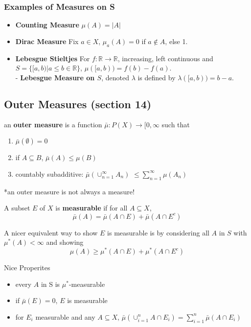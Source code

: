 \documentclass[a4paper, 12pt]{article}
\def\R{\ensuremath{\mathbb{R}}} %
\newcommand{\bt}[1]{\textbf{#1}} %
\begin{document}
\begin{multicols}{2}
\subsubsection{Examples of Measures on S}
\begin{itemize}
    \item \bt{Counting Measure} $\mu(A) = |A|$ 
    \item \bt{Dirac Measure} Fix $a \in X$, $\mu_a(A) = 0$ if $a \not \in A$, else 1.
    \item \bt{Lebesgue Stieltjes} For $f: \R \rightarrow \R$, increasing, left continuous and
    $S = \{[a, b) | a \leq b \in \R \}$, $\mu([a, b)) = f(b) - f(a).$\\
    - \bt{Lebesgue Measure on $S$}, denoted $\lambda$ is defined by $\lambda([a, b)) = b-a.$
\end{itemize}

\subsection{Outer Measures (section 14)}

an \bt{outer measure} is a function $\bar \mu: P(X) \rightarrow [0, \infty$ such that 
\begin{enumerate}
    \item $\bar \mu(\emptyset) = 0$
    \item if $A \subseteq B$, $\bar \mu(A) \leq \mu(B)$
    \item countably subadditive: $\bar \mu( \cup_{n=1}^\infty A_n)$ 
    $\leq \sum_{n=1}^\infty \mu(A_n)$
\end{enumerate}

*an outer measure is not always a measure!

A subset $E$ of $X$ is \bt{measurable} if for all $A \subseteq X$,
$$\bar \mu(A) = \bar \mu(A \cap E) + \bar \mu(A \cap E^c)$$

A nicer equivalent way to show $E$ is measurable is by considering 
all $A$ in $S$ with $\mu^*(A) < \infty$ and showing 
$$\mu(A) \geq \mu^*(A \cap E) + \mu^*(A \cap E^c)$$

Nice Properites
\begin{itemize}
    \item every $A$ in S is $\mu^*$-measurable
    \item if $\bar \mu(E) = 0$, $E$ is measurable
    \item for $E_i$ measurable and any $A \subseteq X$, 
    $\bar \mu(\cup_{i=1}^n A \cap E_i) = \sum_{i=1}^n \bar \mu(A \cap E_i)$
\end{itemize}


\end{multicols}
\end{document}
